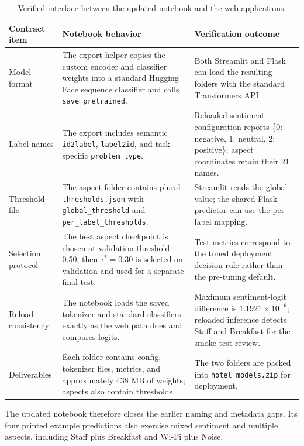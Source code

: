 \documentclass[11pt,a4paper]{report}
\newcommand{\code}[1]{\texttt{#1}}
\begin{document}
\begin{table}[H]
\centering
\caption{Verified interface between the updated notebook and the web applications.}
\label{tab:compatibility}
\small
\begin{tabularx}{\textwidth}{p{2.8cm}>{\raggedright\arraybackslash}X>{\raggedright\arraybackslash}X}
\toprule
Contract item & Notebook behavior & Verification outcome \\
\midrule
Model format & The export helper copies the custom encoder and classifier weights into a standard Hugging Face sequence classifier and calls \code{save\_pretrained}. & Both Streamlit and Flask can load the resulting folders with the standard Transformers API. \\
Label names & The export includes semantic \code{id2label}, \code{label2id}, and task-specific \code{problem\_type}. & Reloaded sentiment configuration reports \{0: negative, 1: neutral, 2: positive\}; aspect coordinates retain their 21 names. \\
Threshold file & The aspect folder contains plural \code{thresholds.json} with \code{global\_threshold} and \code{per\_label\_thresholds}. & Streamlit reads the global value; the shared Flask predictor can use the per-label mapping. \\
Selection protocol & The best aspect checkpoint is chosen at validation threshold 0.50, then \(\tau^*=0.30\) is selected on validation and used for a separate final test. & Test metrics correspond to the tuned deployment decision rule rather than the pre-tuning default. \\
Reload consistency & The notebook loads the saved tokenizer and standard classifiers exactly as the web path does and compares logits. & Maximum sentiment-logit difference is \(1.1921\times10^{-6}\); reloaded inference detects Staff and Breakfast for the smoke-test review. \\
Deliverables & Each folder contains config, tokenizer files, metrics, and approximately 438 MB of weights; aspects also contain thresholds. & The two folders are packed into \code{hotel\_models.zip} for deployment. \\
\bottomrule
\end{tabularx}
\end{table}

The updated notebook therefore closes the earlier naming and metadata gaps.  Its four printed example predictions also exercise mixed sentiment and multiple aspects, including Staff plus Breakfast and Wi-Fi plus Noise.
\end{document}
